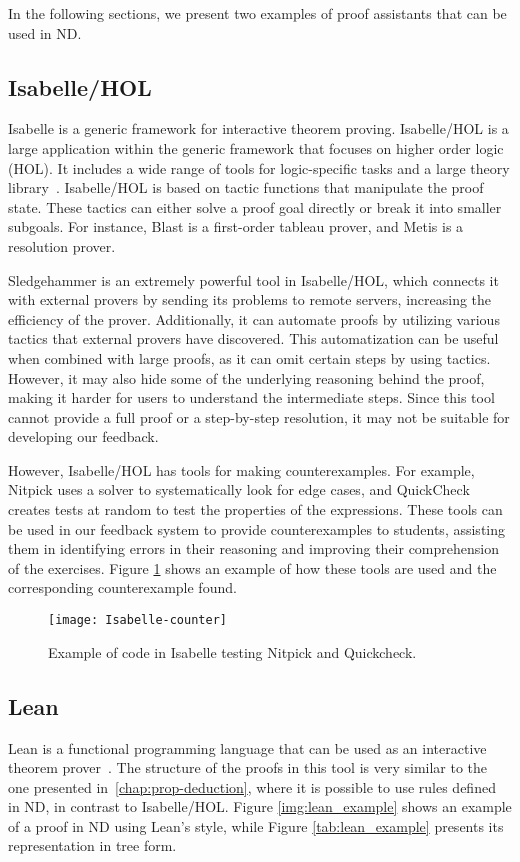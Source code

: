 In the following sections, we present two examples of proof assistants that can be used in \gls{ND}.

\subsection{Isabelle/HOL}
Isabelle is a generic framework for interactive theorem proving. Isabelle/HOL is a large application within the generic framework that focuses on higher order logic (HOL). It includes a wide range of tools for logic-specific tasks and a large theory library~\cite{wenzel_the,blanchette_automatic}. Isabelle/HOL is based on tactic functions that manipulate the proof state. These tactics can either solve a proof goal directly or break it into smaller subgoals. For instance, Blast is a first-order tableau prover, and Metis is a resolution prover.

Sledgehammer is an extremely powerful tool in Isabelle/HOL, which connects it with external provers by sending its problems to remote servers, increasing the efficiency of the prover. Additionally, it can automate proofs by utilizing various tactics that external provers have discovered. This automatization can be useful when combined with large proofs, as it can omit certain steps by using tactics. However, it may also hide some of the underlying reasoning behind the proof, making it harder for users to understand the intermediate steps. Since this tool cannot provide a full proof or a step-by-step resolution, it may not be suitable for developing our feedback.

However, Isabelle/HOL has tools for making counterexamples. For example, Nitpick uses a solver to systematically look for edge cases, and QuickCheck creates tests at random to test the properties of the expressions. These tools can be used in our feedback system to provide counterexamples to students, assisting them in identifying errors in their reasoning and improving their comprehension of the exercises. Figure \ref{img:isabelle-counter} shows an example of how these tools are used and the corresponding counterexample found.
\begin{figure}[htbp]
    \centering
    \texttt{[image: Isabelle-counter]}
    \caption{Example of code in Isabelle testing Nitpick and Quickcheck.}
    \label{img:isabelle-counter}
\end{figure}

\subsection{Lean}
\label{chap:lean}
Lean is a functional programming language that can be used as an interactive theorem prover~\cite{programming}. The structure of the proofs in this tool is very similar to the one presented in~\ref{chap:prop-deduction}, where it is possible to use rules defined in \gls{ND}, in contrast to Isabelle/HOL. Figure \ref{img:lean_example} shows an example of a proof in \gls{ND} using Lean's style, while Figure \ref{tab:lean_example} presents its representation in tree form.


